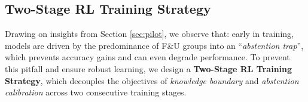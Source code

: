 \documentclass{article} %
\newcommand{\rewardname}{\textsc{KAR}}
\begin{document}




\subsection{Two-Stage RL Training Strategy} 
\label{sec:two-stage}

Drawing on insights from Section \ref{sec:pilot}, we observe that: early in training, models are driven by the predominance of F\&U groups into an ``\textit{abstention trap}'', which prevents accuracy gains and can even degrade performance. 
To prevent this pitfall and ensure robust learning, we design a \textbf{Two-Stage RL Training Strategy}, which decouples the objectives of \textit{knowledge boundary} and \textit{abstention calibration} across two consecutive training stages.
\end{document}
